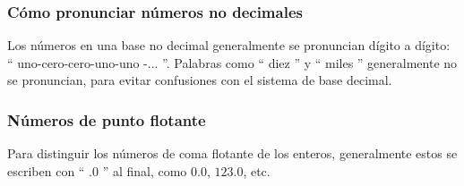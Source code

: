 \subsubsection {Cómo pronunciar números no decimales}

Los números en una base no decimal generalmente se pronuncian dígito a dígito: `` uno-cero-cero-uno-uno -... ''.
Palabras como `` diez '' y `` miles '' generalmente no se pronuncian, para evitar confusiones con el sistema de base decimal.

\subsubsection {Números de punto flotante}

Para distinguir los números de coma flotante de los enteros, generalmente estos se escriben con `` .0 '' al final,
como $ 0.0 $, $ 123.0 $, etc.
